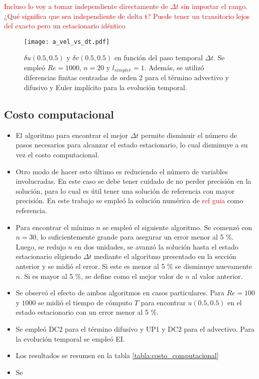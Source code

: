 \documentclass[aps,prb,twocolumn,superscriptaddress,floatfix,longbibliography,10pt]{revtex4-2}
\newif\ifptitle
\newif\ifpnumber
\newcounter{para}
\newcommand\ptitle[1]{\par\refstepcounter{para}
{\ifpnumber{\noindent\textcolor{lightgray}{\textbf{\thepara}}\indent}\fi}
{\ifptitle{\textbf{[{#1}]}}\fi}}
\begin{document}
\textcolor{red}{Incluso lo voy a tomar independiente directamente de $\Delta t$ sin importar el rango. ¿Qué significa que sea independiente de delta t? Puede tener un transitorio lejos del exacto pero un estacionario idéntico}

\begin{figure}[h]
  \texttt{[image: a\_vel\_vs\_dt.pdf]}
  \caption{$\delta u(0.5,0.5)$ y $\delta v(0.5,0.5)$ en función del paso temporal $\Delta t$. Se empleó $Re = 1000$, $n = 20$ y $l_{simpler} = 1$. Además, se utilizó diferencias finitas centradas de orden 2 para el término advectivo y difusivo y Euler implícito para la evolución temporal.}
   \label{fig:a_vel_vs_dt}
\end{figure}


\subsection{Costo computacional}

\ptitle{Resumen}
\begin{itemize}
  \item El algoritmo para encontrar el mejor $\Delta t$ permite disminuir el número de pasos necesarios para alcanzar el estado estacionario, lo cual disminuye a su vez el costo computacional.
  \item Otro modo de hacer esto último es reduciendo el número de variables involucradas. En este caso se debe tener cuidado de no perder precisión en la solución, para lo cual es útil tener una solución de referencia con mayor precisión. En este trabajo se empleó la solución numérica de \textcolor{red}{ref guia} como referencia.
  \item Para encontrar el mínimo $n$ se empleó el siguiente algoritmo. Se comenzó con $n = 30$, lo suficientemente grande para asegurar un error menor al 5 \%. Luego, se redujo $n$ en dos unidades, se avanzó la solución hasta el estado estacionario eligiendo $\Delta t$ mediante el algoritmo presentado en la sección anterior y se midió el error. Si este es menor al 5 \% se disminuye nuevamente $n$. Si es mayor al 5 \%, se define como el mejor valor de $n$ al valor anterior.
  \item Se observó el efecto de ambos algoritmos en casos particulares. Para $Re = 100$ y $1000$ se midió el tiempo de cómputo $T$ para encontrar $u(0.5,0.5)$ en el estado estacionario con un error menor al 5 \%.
  \item Se empleó DC2 para el término difusivo y UP1 y DC2 para el advectivo. Para la evolución temporal se empleó EI.
  \item Los resultados se resumen en la tabla \ref{tabla:costo_computacional}
  \item Se 
\end{itemize}
\end{document}
